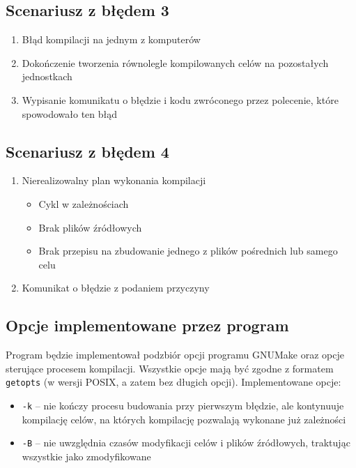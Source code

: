 \documentclass[a4paper]{article}
\begin{document}
\subsection{Scenariusz z błędem 3}

\begin{enumerate}
	\item Błąd kompilacji na jednym z komputerów
	\item Dokończenie tworzenia równolegle kompilowanych celów na pozostałych jednostkach
	\item Wypisanie komunikatu o błędzie i kodu zwróconego przez polecenie, które spowodowało ten błąd
\end{enumerate}


\subsection{Scenariusz z błędem 4}

\begin{enumerate}
	\item Nierealizowalny plan wykonania kompilacji
		\begin{itemize}
			\item Cykl w zależnościach
			\item Brak plików źródłowych
			\item Brak przepisu na zbudowanie jednego z plików pośrednich lub samego celu
		\end{itemize}
	\item Komunikat o błędzie z podaniem przyczyny
\end{enumerate}

\subsection{Opcje implementowane przez program}

Program będzie implementował podzbiór opcji programu GNUMake oraz opcje sterujące procesem kompilacji. Wszystkie opcje mają być zgodne z formatem \verb+getopts+ (w wersji POSIX, a zatem bez długich opcji).
Implementowane opcje:

\begin{itemize}
	\item \verb+-k+ -- nie kończy procesu budowania przy pierwszym błędzie, ale kontynuuje kompilację celów, na których kompilację pozwalają wykonane już zależności
	\item \verb+-B+ -- nie uwzględnia czasów modyfikacji celów i plików źródłowych, traktując wszystkie jako zmodyfikowane
\end{itemize}
\end{document}
